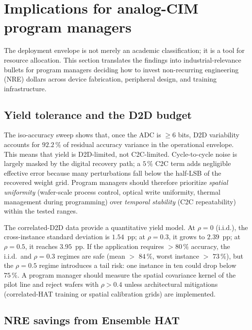 \section{Implications for analog-CIM program managers}
\label{sec:program-manager}

The deployment envelope is not merely an academic classification; it is a tool for resource allocation.  This section translates the findings into industrial-relevance bullets for program managers deciding how to invest non-recurring engineering (NRE) dollars across device fabrication, peripheral design, and training infrastructure.

\subsection{Yield tolerance and the D2D budget}

The iso-accuracy sweep shows that, once the ADC is $\ge 6$ bits, D2D variability accounts for $92.2\,\%$ of residual accuracy variance in the operational envelope.  This means that yield is D2D-limited, not C2C-limited.  Cycle-to-cycle noise is largely masked by the digital recovery path; a $5\,\%$ C2C term adds negligible effective error because many perturbations fall below the half-LSB of the recovered weight grid.  Program managers should therefore prioritize \emph{spatial uniformity} (wafer-scale process control, optical write uniformity, thermal management during programming) over \emph{temporal stability} (C2C repeatability) within the tested ranges.

The correlated-D2D data provide a quantitative yield model.  At $\rho=0$ (i.i.d.), the cross-instance standard deviation is $1.54$~pp; at $\rho=0.3$, it grows to $2.39$~pp; at $\rho=0.5$, it reaches $3.95$~pp.  If the application requires $>80\,\%$ accuracy, the i.i.d.~and $\rho=0.3$ regimes are safe (mean $>$ $84\,\%$, worst instance $>$ $73\,\%$), but the $\rho=0.5$ regime introduces a tail risk: one instance in ten could drop below $75\,\%$.  A program manager should measure the spatial covariance kernel of the pilot line and reject wafers with $\rho > 0.4$ unless architectural mitigations (correlated-HAT training or spatial calibration grids) are implemented.

\subsection{NRE savings from Ensemble HAT}

